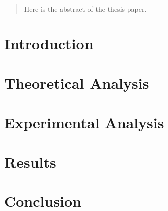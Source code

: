 \documentclass[12pt, a4paper]{report}
\author{oslo@itu.dk&ppho@itu.dk}
\begin{document}
\sffamily

%

\listoftodos



\begin{abstract}
Here is the abstract of the thesis paper.
\end{abstract}

\tableofcontents
\newpage



\chapter{Introduction}
\label{chap:introduction}


\restoregeometry
\newpage

\chapter{Theoretical Analysis}
\label{chap:theory}


\restoregeometry
\newpage

\chapter{Experimental Analysis}
\label{chap:experimentalAnalysis}


\restoregeometry
\newpage

\chapter{Results}
\label{chap:results}

\restoregeometry
\newpage

\chapter{Conclusion}
\label{chap:conclusion}

%
\restoregeometry
\newpage

\printbibliography
\end{document}
